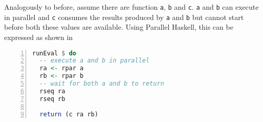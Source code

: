 Analogously to before, assume there are function \texttt{a}, \texttt{b} and \texttt{c}. \texttt{a} and \texttt{b} can execute in parallel and \texttt{c} consumes the results produced by \texttt{a} and \texttt{b} but cannot start before both these values are available. Using \textsf{Parallel Haskell}, this can be expressed as shown in 
\begin{lstlisting}[language=Haskell, numbers=left, frame=bt, label=lst:example_parallel_haskell, caption={Parallel and sequential composition in \textsf{Parallel Haskell}.}]
runEval $ do
  -- execute a and b in parallel
  ra <- rpar a
  rb <- rpar b
  -- wait for both a and b to return
  rseq ra
  rseq rb
  
  return (c ra rb)
\end{lstlisting}